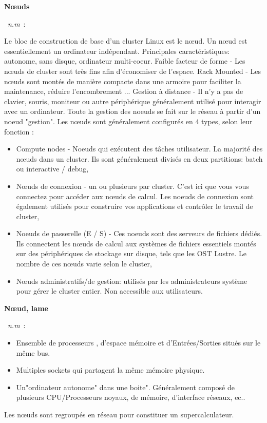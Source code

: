 \documentclass[10pt,a4paper,twoside]{article} %
\newcommand{\entry}[3]{\textbf{#1}\markboth{#1}{#1}\  \textit{#2}\ :  {#3}} %
\begin{document}
\begin{multicols}{2}

\entry{Nœuds}{n.m}{Le bloc de construction de base d'un cluster Linux est le nœud. Un nœud est essentiellement un ordinateur indépendant. Principales caractéristiques: autonome, sans disque, ordinateur multi-coeur. Faible facteur de forme - Les nœuds de cluster sont très fins afin d'économiser de l'espace. Rack Mounted - Les nœuds sont montés de manière compacte dans une armoire pour faciliter la maintenance, réduire l'encombrement ... Gestion à distance - Il n'y a pas de clavier, souris, moniteur ou autre périphérique généralement utilisé pour interagir avec un ordinateur. Toute la gestion des noeuds se fait sur le réseau à partir d'un noeud "gestion".
Les nœuds sont généralement configurés en 4 types, selon leur fonction :
\begin{itemize}
  \item Compute nodes - Noeuds qui exécutent des tâches utilisateur. La majorité des nœuds dans un cluster. Ils sont généralement divisés en deux partitions: batch ou interactive / debug, 
  \item Nœuds de connexion - un ou plusieurs par cluster. C'est ici que vous vous connectez pour accéder aux nœuds de calcul. Les noeuds de connexion sont également utilisés pour construire vos applications et contrôler le travail de cluster,
  \item Noeuds de passerelle (E / S) - Ces noeuds sont des serveurs de fichiers dédiés. Ils connectent les nœuds de calcul aux systèmes de fichiers essentiels montés sur des périphériques de stockage sur disque, tels que les OST Lustre. Le nombre de ces nœuds varie selon le cluster,
  \item Nœuds administratifs/de gestion: utilisés par les administrateurs système pour gérer le cluster entier. Non accessible aux utilisateurs.
\end{itemize}}

\entry{Nœud, lame}{n.m}{\begin{itemize}
  \item Ensemble de processeurs , d'espace mémoire et d'Entrées/Sorties situés sur le même bus.
  \item Multiples sockets qui partagent la même mémoire physique.
  \item Un"ordinateur autonome" dans une boite". Généralement composé de plusieurs CPU/Processeurs noyaux, de mémoire, d'interface réseaux, ec.. 
\end{itemize} Les nœuds sont regroupés en réseau pour constituer un supercalculateur.}


\end{multicols}
\end{document}
